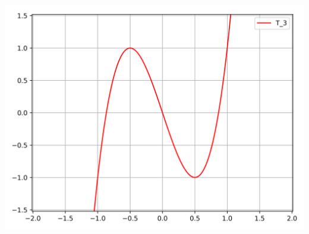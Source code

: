 \documentclass[11pt,class=report,crop=false]{standalone}
\begin{document}
\begin{center}
  \includegraphics[scale=\myscale,scale=0.3]{figures/approx-tchebychev-01-3}


\end{center}
\end{document}
